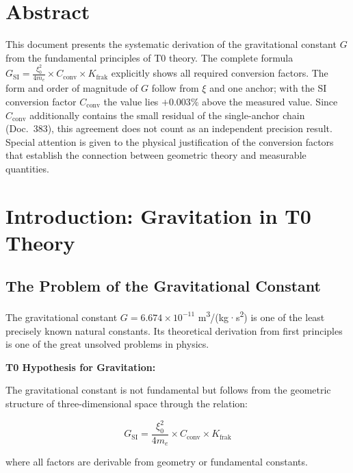 \section*{Abstract}
		This document presents the systematic derivation of the gravitational constant $G$ from the fundamental principles of T0 theory. The complete formula $G_{\text{SI}} = \frac{\xi_0^2}{4 m_e} \times C_{\text{conv}} \times K_{\text{frak}}$ explicitly shows all required conversion factors. The form and order of magnitude of $G$ follow from $\xi$ and one anchor; with the SI conversion factor $C_{\text{conv}}$ the value lies $+0.003\%$ above the measured value. Since $C_{\text{conv}}$ additionally contains the small residual of the single-anchor chain (Doc.~383), this agreement does not count as an independent precision result. Special attention is given to the physical justification of the conversion factors that establish the connection between geometric theory and measurable quantities.

	
	
	\section{Introduction: Gravitation in T0 Theory}
	
	\subsection{The Problem of the Gravitational Constant}
	
	The gravitational constant $G = 6.674 \times 10^{-11}$ m\textsuperscript{3}/(kg·s\textsuperscript{2}) is one of the least precisely known natural constants. Its theoretical derivation from first principles is one of the great unsolved problems in physics.
	
	\begin{keyresult}
		\textbf{T0 Hypothesis for Gravitation:}
		
		The gravitational constant is not fundamental but follows from the geometric structure of three-dimensional space through the relation:
		
		\begin{equation}
			\boxed{G_{\text{SI}} = \frac{\xi_0^2}{4 m_e} \times C_{\text{conv}} \times K_{\text{frak}}}
			\label{eq:G_complete}
		\end{equation}
		
		where all factors are derivable from geometry or fundamental constants.
	\end{keyresult}
	
